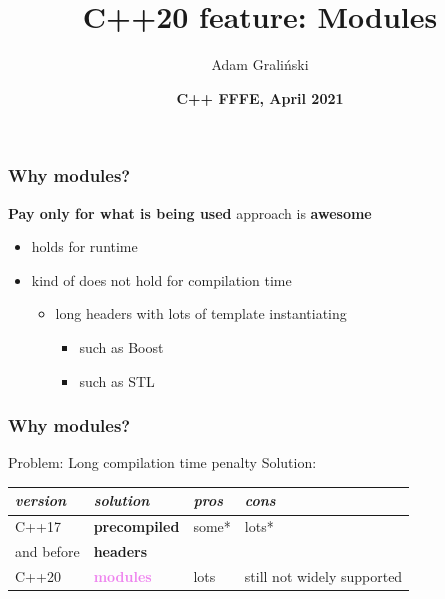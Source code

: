 \documentclass[aspectratio=169]{beamer}
\title[LTN04 :: Cpp20\_Modules]{C++20 feature: Modules}
\author{Adam Graliński}
\date[FFFE\_21]{\textbf{C++ {\color{red}F}{\color{blue}F}{\color{green}F}{\color{yellow}E}, April 2021}}
\begin{document}
{
\begin{frame}
\titlepage{}
\end{frame}
}

\begin{frame}
\frametitle{Why modules?}
\Large{\textbf{\textcolor{clViolet}{Pay only for what is being used}} approach is \textbf{awesome}}
\begin{itemize}
  \item{holds for runtime}
  \item{kind of does not hold for compilation time}
  \begin{itemize}
    \item{long headers with lots of template instantiating}
    \begin{itemize}
      \item{such as Boost}
      \item{such as STL}
    \end{itemize}
  \end{itemize}
\end{itemize}
\end{frame}

\begin{frame}
\frametitle{Why modules?}
Problem: \textcolor{clViolet}{Long compilation time penalty}
\linebreak{}
Solution:
\begin{table}
  \begin{tabular}{l l l l}
    \textit{version} \hspace{1cm} &
    \textit{solution} \hspace{1cm} &
    \textit{pros} &
    \textit{cons} \\
    \midrule{}
    C++17 & \textbf{precompiled} & some* & lots* \\
    and before & \textbf{headers} & & \\
    \midrule{}
    C++20 & \textbf{\textcolor{violet}{modules}} & lots & still not widely supported \\
  \end{tabular}
\end{table}
\end{frame}
\end{document}
